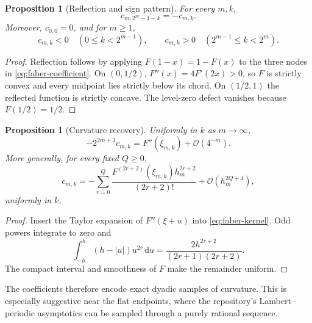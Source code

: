 \documentclass[11pt,oneside]{article}
\newtheorem{proposition}[theorem]{Proposition}
\theoremstyle{definition}
\theoremstyle{remark}
\newcommand{\dd}{\,\mathrm d}
\newcommand{\bigO}{\mathcal O}
\newcommand{\1}{\mathbf 1}
\begin{document}
\begin{proposition}[Reflection and sign pattern]
\label{prop:faber-sign}
For every $m,k$,
\begin{equation}
 c_{m,2^m-1-k}=-c_{m,k}.                                 \label{eq:faber-reflection}
\end{equation}
Moreover, $c_{0,0}=0$, and for $m\ge1$,
\begin{equation}
 c_{m,k}<0\quad(0\le k<2^{m-1}),
 \qquad
 c_{m,k}>0\quad(2^{m-1}\le k<2^m).                     \label{eq:faber-sign}
\end{equation}
\end{proposition}

\begin{proof}
Reflection follows by applying $F(1-x)=1-F(x)$ to the three nodes in
\eqref{eq:faber-coefficient}.  On $(0,1/2)$,
$F''(x)=4F'(2x)>0$, so $F$ is strictly convex and every midpoint lies strictly
below its chord.  On $(1/2,1)$ the reflected function is strictly concave.
The level-zero defect vanishes because $F(1/2)=1/2$.
\end{proof}

\begin{proposition}[Curvature recovery]
\label{prop:faber-curvature}
Uniformly in $k$ as $m\to\infty$,
\begin{equation}
 -2^{2m+3}c_{m,k}
 =F''(\xi_{m,k})+\bigO(4^{-m}).                          \label{eq:faber-curvature}
\end{equation}
More generally, for every fixed $Q\ge0$,
\begin{equation}
 c_{m,k}=-\sum_{r=0}^{Q}
 \frac{F^{(2r+2)}(\xi_{m,k})h_m^{2r+2}}{(2r+2)!}
 +\bigO(h_m^{2Q+4}),                                     \label{eq:faber-curvature-full}
\end{equation}
uniformly in $k$.
\end{proposition}

\begin{proof}
Insert the Taylor expansion of $F''(\xi+u)$ into
\eqref{eq:faber-kernel}.  Odd powers integrate to zero and
\[
 \int_{-h}^{h}(h-|u|)u^{2r}\dd u
 =\frac{2h^{2r+2}}{(2r+1)(2r+2)}.
\]
The compact interval and smoothness of $F$ make the remainder uniform.
\end{proof}

The coefficients therefore encode exact dyadic samples of curvature.  This
is especially suggestive near the flat endpoints, where the repository's
Lambert--periodic asymptotics can be sampled through a purely rational
sequence.
\end{document}
